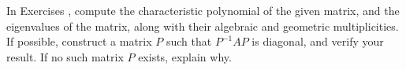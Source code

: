 {\noin In Exercises }
{, compute the characteristic polynomial of the given matrix, and the eigenvalues of the matrix, along with their algebraic and geometric multiplicities. If possible, construct a matrix $P$ such that $P^{-1}AP$ is diagonal, and verify your result. If no such matrix $P$ exists, explain why.}
